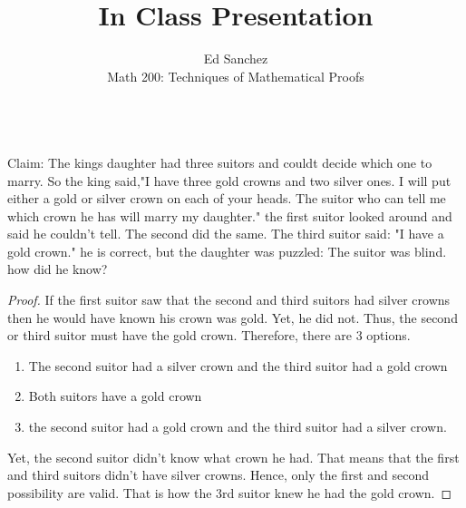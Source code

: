 \documentclass[12pt]{article}
\newenvironment{problem}[2][Problem]{\begin{trivlist}
\item[\hskip \labelsep {\bfseries #1}\hskip \labelsep {\bfseries #2.}]}{\end{trivlist}}
\begin{document}
 
\title{In Class Presentation}
\author{Ed Sanchez\\ 
Math 200: Techniques of Mathematical Proofs}
 
\maketitle
 
\begin{problem}{6.14}
\text{ }\\
Claim: The kings daughter had three suitors and couldt decide which one to marry. So the king said,"I have three gold crowns and two silver ones. I will put either a gold or silver crown on each of your heads. The suitor who can tell me which crown he has will marry my daughter." the first suitor looked around and said he couldn't tell. The second did the same. The third suitor said: "I have a gold crown." he is correct, but the daughter was puzzled: The suitor was blind. how did he know? 
\end{problem}
 
\begin{proof}
If the first suitor saw that the second and third suitors had silver crowns then he would have known his crown was gold. Yet, he did not. Thus, the second or third suitor must have the gold crown. Therefore, there are 3 options.
\begin{enumerate}
\item The second suitor had a silver crown and the third suitor had a gold crown
\\
\item Both suitors have a gold crown
\\
\item the second suitor had a gold crown and the third suitor had a silver crown. 
\end{enumerate}
Yet, the second suitor didn't know what crown he had. That means that the first and third suitors didn't have silver crowns. Hence, only the first and second possibility are valid. That is how the 3rd suitor knew he had the gold crown.  
\end{proof}
 
\end{document}
